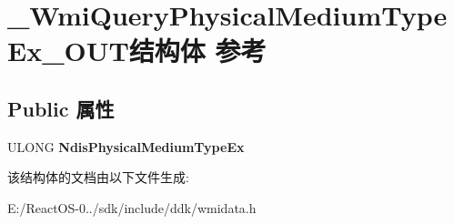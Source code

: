 \hypertarget{struct___wmi_query_physical_medium_type_ex___o_u_t}{}\section{\+\_\+\+Wmi\+Query\+Physical\+Medium\+Type\+Ex\+\_\+\+O\+U\+T结构体 参考}
\label{struct___wmi_query_physical_medium_type_ex___o_u_t}
\subsection*{Public 属性}
\begin{DoxyCompactItemize}
\item 
\mbox{\label{struct___wmi_query_physical_medium_type_ex___o_u_t_a6bc9070d51583729b1522a2b1923de12}} 
U\+L\+O\+NG {\bfseries Ndis\+Physical\+Medium\+Type\+Ex}
\end{DoxyCompactItemize}


该结构体的文档由以下文件生成\+:\begin{DoxyCompactItemize}
\item 
E\+:/\+React\+O\+S-\/0../sdk/include/ddk/wmidata.\+h\end{DoxyCompactItemize}
